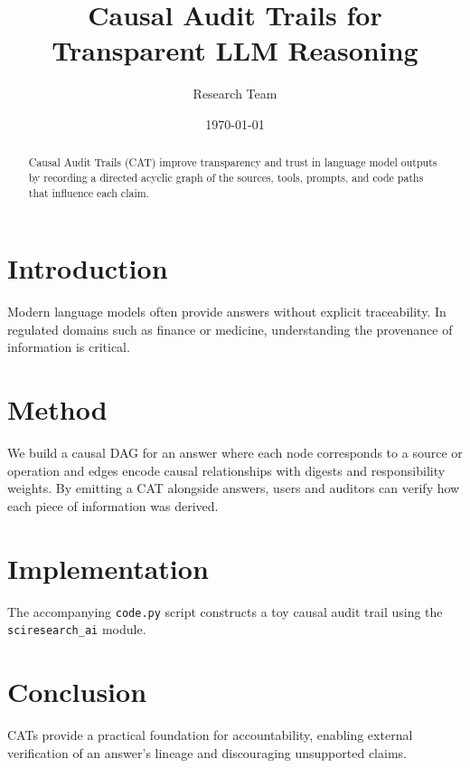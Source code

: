 \documentclass{article}
\title{Causal Audit Trails for Transparent LLM Reasoning}
\author{Research Team}
\date{\today}
\begin{document}
\maketitle

\begin{abstract}
Causal Audit Trails (CAT) improve transparency and trust in language
model outputs by recording a directed acyclic graph of the sources,
tools, prompts, and code paths that influence each claim.
\end{abstract}

\section{Introduction}
Modern language models often provide answers without explicit
traceability. In regulated domains such as finance or medicine,
understanding the provenance of information is critical.

\section{Method}
We build a causal DAG for an answer where each node corresponds to a
source or operation and edges encode causal relationships with digests
and responsibility weights. By emitting a CAT alongside answers, users
and auditors can verify how each piece of information was derived.

\section{Implementation}
The accompanying \texttt{code.py} script constructs a toy causal audit
trail using the \texttt{sciresearch\_ai} module.

\section{Conclusion}
CATs provide a practical foundation for accountability, enabling
external verification of an answer's lineage and discouraging
unsupported claims.
\end{document}
